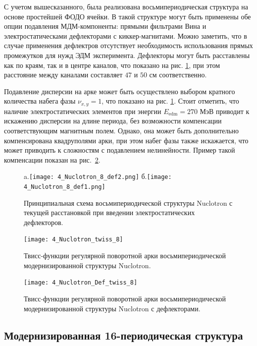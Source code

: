 \par С учетом вышесказанного, была реализована восьмипериодическая структура на основе простейшей ФОДО ячейки. В такой структуре могут быть применены обе опции подавления МДМ-компоненты: прямыми фильтрами Вина и электростатическами дефлекторами с киккер-магнитами. Можно заметить, что в случае применения дефлектров отсутствует необходимость использования прямых промежутков для нужд ЭДМ эксперимента. Дефлекторы могут быть расставлены как по краям, так и в центре каналов, что показано на рис. \ref{fig:4_Nuclotron_8}, при этом расстояние между каналами составляет $47$ и $50$ см соответственно.

\par Подавление дисперсии на арке может быть осуществлено выбором кратного количества набега фазы $\nu_{x,y} = 1$, что показано на рис. \ref{fig:4_Nuclotron_8}. Стоит отметить, что наличие электростатических элементов при энергии $E_{\textrm{edm}}=270$ МэВ приводит к искажению дисперсии на длине периода, без возможности компенсации соответствующим магнитным полем. Однако, она может быть дополнительно компенсирована квадруполями арки, при этом набег фазы также искажается, что может приводить к сложностям с подавлением нелинейности. Пример такой компенсации показан на рис.~\ref{fig:4_Nuclotron_twiss_8}.

\begin{figure}[!h]
  \centering
   a.\texttt{[image: 4\_Nuclotron\_8\_def2.png]}
   б.\texttt{[image: 4\_Nuclotron\_8\_def1.png]}
   \caption{Принципиальная схема восьмипериодической структуры Nuclotron с текущей расстановкой при введении электростатических дефлекторов.}
   \label{fig:4_Nuclotron_8}
\end{figure}

\begin{figure}[!h]
  \centering
   \texttt{[image: 4\_Nuclotron\_twiss\_8]}
   \caption{Твисс-функции регулярной поворотной арки восьмипериодической модернизированной структуры Nuclotron.}
   \label{fig:4_Nuclotron_twiss_8}
\end{figure}

\begin{figure}[!h]
  \centering
   \texttt{[image: 4\_Nuclotron\_Def\_twiss\_8]}
   \caption{Твисс-функции регулярной поворотной арки восьмипериодической модернизированной структуры Nuclotron с дефлекторами.}
   \label{fig:4_Nuclotron_Def_twiss_8}
\end{figure}

\newpage
	\subsection{Модернизированная 16-периодическая структура}\label{sec:EDM/optics/16period}

